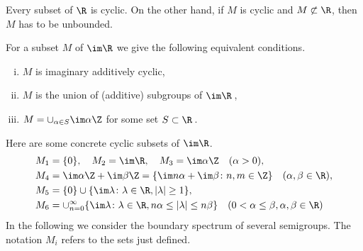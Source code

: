 	Every subset of $\R$ is cyclic. On the other hand, if $M$ is cyclic and $M \not\subset \R$, then $M$ has to be unbounded.
	
	For a subset $M$ of $\im \R$ we give the following equivalent conditions.
	\begin{enumerate}[(i)]
		\item 
		$M$ is imaginary additively cyclic,
		
		\item 
		$M$ is the union of (additive) subgroups of $\im \R$\,,
		
		\item 
		$M = \cup_{\alpha \in S} \im\alpha\Z$ for some set $S \subset \R$\,.
	\end{enumerate}
	
	Here are some concrete cyclic subsets of $\im \R$.
	\begin{align*}
		M_{1} &= \{0\}, \quad M_{2} = \im\R, \quad M_{3} = \im\alpha\Z \quad (\alpha > 0), \\
		M_{4} &= \im\alpha\Z + \im\beta\Z = \{\im n\alpha +  \im\beta \colon n,m \in \Z\} \quad (\alpha, \beta \in \R), \\
		M_{5} &= \{0\} \cup \{\im \lambda \colon \lambda \in \R, |\lambda| \geq 1\}, \\
		M_{6} &= \cup_{n=0}^{\infty}\{\im \lambda \colon \lambda \in \R, n\alpha \leq |\lambda| \leq n\beta\} \quad (0 < \alpha \leq \beta, \alpha,\beta \in \R)
	\end{align*}
	In the following we consider the boundary spectrum of several semigroups. The notation $M_{i}$ refers to the sets just defined.
